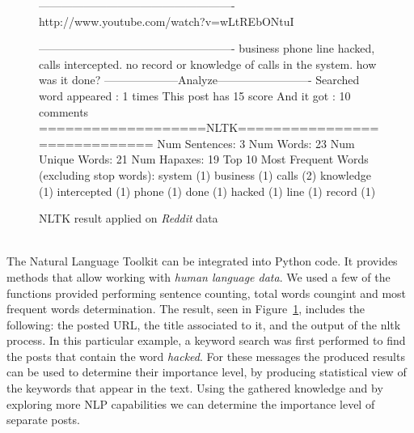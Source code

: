 \documentclass[12pt]{article}
\begin{document}
\begin{figure}[h]
\begin{footnotesize}
\begin{spverbatim}
----------------------------------------------------
http://www.youtube.com/watch?v=wLtREbONtuI 

----------------------------------------------------
business phone line hacked, calls intercepted. no record or
knowledge of calls in the system. how was it done?
--------------------Analyze-------------------------
Searched word appeared :  1  times
This post has  15  score
And it got  :  10  comments
===================NLTK=============================
	Num Sentences:           3
	Num Words:               23
	Num Unique Words:        21
	Num Hapaxes:             19
	Top 10 Most Frequent Words (excluding stop words):
		system (1)
		business (1)
		calls (2)
		knowledge (1)
		intercepted (1)
		phone (1)
		done (1)
		hacked (1)
		line (1)
		record (1)
\end{spverbatim}
\end{footnotesize}
\captionsetup{font=small}
\caption{NLTK result applied on \textit{Reddit} data}
\label{fig:nltk}
\end{figure}
\hfill \break
\\
The Natural Language Toolkit \cite{nltk} can be integrated into Python code. It provides methods that allow working with \textit{human language data}. We used a few of the functions provided performing sentence counting, total words coungint and most frequent words determination.  The result, seen in Figure~\ref{fig:nltk}, includes the following: the posted URL, the title associated to it, and the output of the nltk process. In this particular example, a keyword search was first performed to find the posts that contain the word \textit{hacked}. For these messages the produced results can be used to determine their importance level, by producing statistical view of the keywords that appear in the text. Using the gathered knowledge and by exploring more NLP capabilities we can determine the importance level of separate posts.
\end{document}
